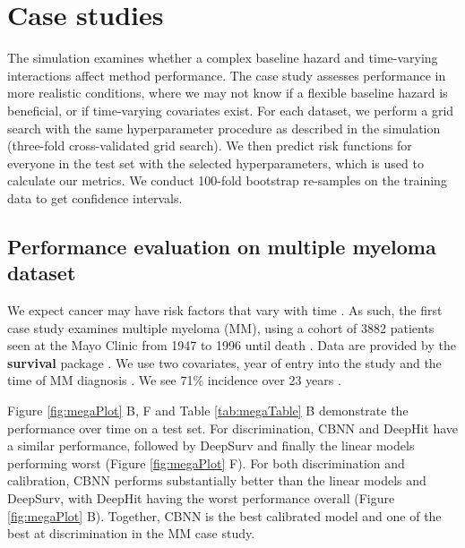 \documentclass[preprint,12pt,authoryear]{elsarticle}
\begin{document}


\hypertarget{casestudies}{%
\section{Case studies}\label{casestudies}}

The simulation examines whether a complex baseline hazard and time-varying interactions affect method performance.
The case study assesses performance in more realistic conditions, where we may not know if a flexible baseline hazard is beneficial, or if time-varying covariates
exist. For each dataset, we perform a grid search with the same hyperparameter procedure as described in the simulation (three-fold cross-validated grid search).
We then predict risk functions for everyone in the test set with the selected hyperparameters, which is used to calculate our metrics. We conduct 100-fold
bootstrap re-samples on the training data to get confidence intervals.

\hypertarget{pe-multiplemyeloma}{%
\subsection{Performance evaluation on multiple myeloma dataset}\label{pe-multiplemyeloma}}
We expect cancer may have risk factors that vary with time \citep{coradini2000time}. As such, the first case study examines multiple myeloma (MM),
using a cohort of 3882 patients seen at the Mayo Clinic from 1947 to 1996 until death \citep{myeloma}. Data are provided by the \textbf{survival} package \citep{survpkg}.
We use two covariates, year of entry into the study and the time of MM diagnosis \citep{myeloma}. We see 71\% incidence over 23 years \citep{myeloma}.

Figure \ref{fig:megaPlot} B, F and Table \ref{tab:megaTable} B demonstrate the performance over time on a test set. For discrimination, CBNN and DeepHit have a
similar performance, followed by DeepSurv and finally the linear models performing worst (Figure \ref{fig:megaPlot} F). For both discrimination and calibration, CBNN
performs substantially better than the linear models and DeepSurv, with DeepHit having the worst performance overall (Figure \ref{fig:megaPlot} B). Together, CBNN
is the best calibrated model and one of the best at discrimination in the MM case study.
\end{document}
